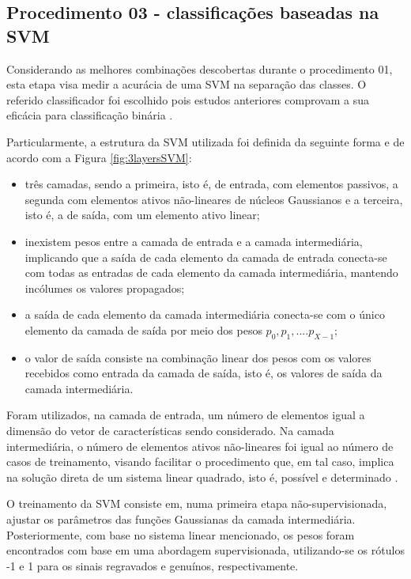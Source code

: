 		

		\subsection{Procedimento 03 - classificações baseadas na SVM}
		\label{chap:propApproach:sec:Experimento03}
		\par Considerando as melhores combinações descobertas durante o procedimento 01, esta etapa visa medir a acurácia de uma SVM na separação das classes. O referido classificador foi escolhido pois estudos anteriores comprovam a sua eficácia para classificação binária \cite{bennett2000support}. 
		
		\par Particularmente, a estrutura da SVM utilizada foi definida da seguinte forma e de acordo com a Figura \ref{fig:3layersSVM}: 
		\begin{itemize}
		\item{}três camadas, sendo a primeira, isto é, de entrada, com elementos passivos, a segunda com elementos ativos não-lineares de núcleos Gaussianos e a terceira, isto é, a de saída, com um elemento ativo linear; 
		\item{}inexistem pesos entre a camada de entrada e a camada intermediária, implicando que a saída de cada elemento da camada de entrada conecta-se com todas as entradas de cada elemento da camada intermediária, mantendo incólumes os valores propagados;
		\item{}a saída de cada elemento da camada intermediária conecta-se com o único elemento da camada de saída por meio dos pesos $p_0, p_1, .... p_{X-1}$;
		\item{}o valor de saída consiste na combinação linear dos pesos com os valores recebidos como entrada da camada de saída, isto é, os valores de saída da camada intermediária.
		\end{itemize}

		

		\par Foram utilizados, na camada de entrada, um número de elementos igual a dimensão do vetor de características sendo considerado. Na camada intermediária, o número de elementos ativos não-lineares foi igual ao número de casos de treinamento, visando facilitar o procedimento que, em tal caso, implica na solução direta de um sistema linear quadrado, isto é, possível e determinado \cite{poole2014linear}. 
		
		\par O treinamento da SVM consiste em, numa primeira etapa não-supervisionada, ajustar os parâmetros das funções Gaussianas da camada intermediária. Posteriormente, com base no sistema linear mencionado, os pesos foram encontrados com base em uma abordagem supervisionada, utilizando-se os rótulos -1 e 1 para os sinais regravados e genuínos, respectivamente.    
		
